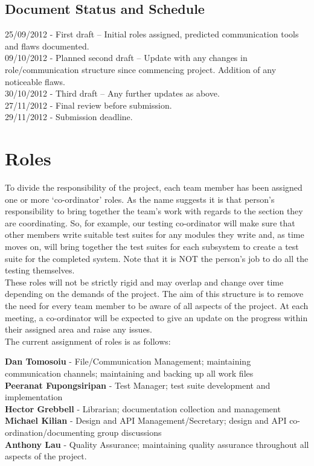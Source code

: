 \documentclass{l3deliverable}
\begin{document}
\subsection{Document Status and Schedule}

25/09/2012 - First draft – Initial roles assigned, predicted communication tools and flaws documented.\\
{\color{red}09/10/2012} - Planned second draft – Update with any changes in role/communication structure since commencing project. Addition of any noticeable flaws.\\
{\color{red}30/10/2012} - Third draft – Any further updates as above.\\
{\color{red}27/11/2012} - Final review before submission.\\
{\color{red}29/11/2012} - Submission deadline.\\


\section{Roles}

To divide the responsibility of the project, each team member has been assigned one or more `co-ordinator' roles. As the name suggests it is that person's responsibility to bring together the team's work with regards to the section they are coordinating. So, for example, our testing co-ordinator will make sure that other members write suitable test suites for any modules they write and, as time moves on, will bring together the test suites for each subsystem to create a test suite for the completed system. Note that it is NOT the person's job to do all the testing themselves. 
\\
These roles will not be strictly rigid and may overlap and change over time depending on the demands of the project. The aim of this structure is to remove the need for every team member to be aware of all aspects of the project. At each meeting, a co-ordinator will be expected to give an update on the progress within their assigned area and raise any issues.
\\

The current assignment of roles is as follows:

{\bf Dan Tomosoiu} - File/Communication Management; maintaining communication channels; maintaining and backing up all work files\\
{\bf Peeranat Fupongsiripan} - Test Manager; test suite development and implementation\\
{\bf Hector Grebbell} - Librarian; documentation collection and management\\
{\bf Michael Kilian} - Design and API Management/Secretary; design and API co-ordination/documenting group discussions\\
{\bf Anthony Lau} - Quality Assurance; maintaining quality assurance throughout all aspects of the project.\\
\end{document}
